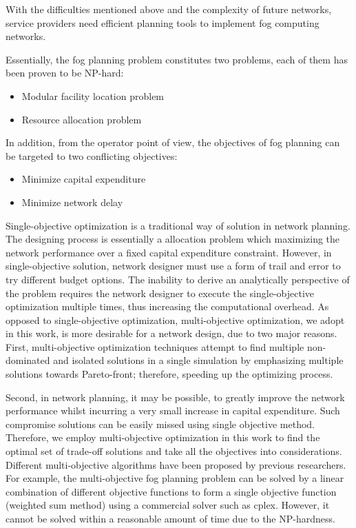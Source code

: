 \documentclass[10pt,journal,compsoc]{IEEEtran}
\begin{document}
With the difficulties mentioned above and the complexity of future networks, service providers need efficient planning tools to implement fog computing networks. 

Essentially, the fog planning problem constitutes two problems, each of them has been proven to be NP-hard:
\begin{itemize}
\item Modular facility location problem
\item Resource allocation problem
\end{itemize}
In addition, from the operator point of view, the objectives of fog planning can be targeted to two conflicting objectives:
\begin{itemize}
\item Minimize capital expenditure
\item Minimize network delay
\end{itemize}

Single-objective optimization is a traditional way of solution in network planning. The designing process is essentially a allocation problem which maximizing the network performance over a fixed capital expenditure constraint. 
However, in single-objective solution, network designer must use a form of trail and error to try different budget options. The inability to derive an analytically perspective of the problem requires the network designer to execute the single-objective optimization multiple times, thus increasing the computational overhead. 
As opposed to single-objective optimization, multi-objective optimization, we adopt in this work, is more desirable for a network design, due to two major reasons. First, multi-objective optimization techniques attempt to find multiple non-dominated and isolated solutions in a single simulation by emphasizing multiple solutions towards Pareto-front; therefore, speeding up the optimizing process. 

Second, in network planning, it may be possible, to greatly improve the network performance whilst incurring a very small increase in capital expenditure. Such compromise solutions can be easily missed using single objective method. Therefore, we employ multi-objective optimization in this work to find the optimal set of trade-off solutions and take all the objectives into considerations.
\iffalse
Different multi-objective algorithms have been proposed by previous researchers. For example, the multi-objective fog planning problem can be solved by a linear combination of different objective functions to form a single objective function (weighted sum method) using a commercial solver such as cplex. However, it cannot be solved within a reasonable amount of time due to the NP-hardness.
\end{document}
